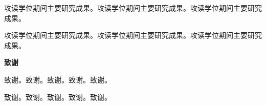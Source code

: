 \documentclass{csuthesis}
\begin{document}
    攻读学位期间主要研究成果。攻读学位期间主要研究成果。攻读学位期间主要研究成果。

    攻读学位期间主要研究成果。攻读学位期间主要研究成果。攻读学位期间主要研究成果。
    
    \newpage
    \vspace*{\baselineskip}
    \vspace*{18bp}
    \begin{center}
    	 \heiti \bfseries 致\hspace*{1.5em}谢
    \end{center}
    \vspace*{12bp}
    \vspace*{\baselineskip}
    
    致谢。致谢。致谢。致谢。致谢。

    致谢。致谢。致谢。致谢。致谢。
\end{document}
